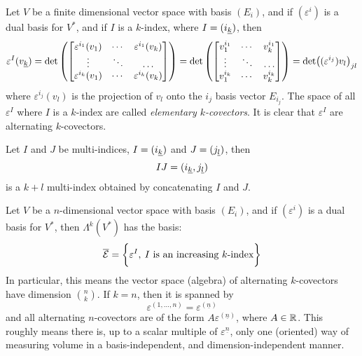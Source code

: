 \documentclass[../main-manifolds.tex]{subfiles}
\begin{document}
\begin{definition}
    Let $V$ be a finite dimensional vector space with basis $(E_i)$, and if $(\varepsilon^i)$ is a dual basis for $V^*$, and if $I$ is a $k$-index, where $I = (\Ul{i}[k])$, then
    \[
        \varepsilon^I(\Ul{v}[k]) = \det\left(\begin{bmatrix}
            \varepsilon^{i_1}(v_1) & \cdots & \varepsilon^{i_1}(v_k)\\
            \vdots & \ddots & \ldots \\
            \varepsilon^{i_k}(v_1) & \cdots & \varepsilon^{i_k}(v_k)
        \end{bmatrix}\right) = \det\left(\begin{bmatrix}
            v_1^{i_1}  & \cdots & v_k^{i_1} \\
            \vdots     & \ddots & \ldots    \\
            v_1^{i_k}  & \cdots & v_k^{i_k}
        \end{bmatrix}\right) = \det((\varepsilon^{i_j})v_l)_{jl}
    \]
    where $\varepsilon^{i_j}(v_l)$ is the projection of $v_l$ onto the $i_j$ basis vector $E_{i_j}$. The space of all $\varepsilon^I$ where $I$ is a $k$-index are called \emph{elementary $k$-covectors}. It is clear that $\varepsilon^I$ are alternating $k$-covectors.
\end{definition}

\begin{definition}
    Let $I$ and $J$ be multi-indices, $I = (\Ul{i}[k])$ and $J = (\Ul{j}[l])$, then
    \[
    IJ = (\Ul{i}[k],\Ul{j}[l])
    \]
    is a $k+l$ multi-index obtained by concatenating $I$ and $J$.
\end{definition}

\begin{wts}[Proposition 14.8]\label{lee-chp14:prop-14.8}
    Let $V$ be a $n$-dimensional vector space with basis $(E_i)$, and if $(\varepsilon^i)$ is a dual basis for $V^*$, then $\Lambda^k(V^*)$ has the basis:
    \[
        \overline{\mathcal{E}}=\biggl\{{\varepsilon^I,\: I\text{ is an increasing }k\text{-index}}\biggr\}
    \]
    In particular, this means the vector space (algebra) of alternating $k$-covectors have dimension $\binom{n}{k}$. If $k=n$, then it is spanned by 
    \[
        \varepsilon^{(1,\ldots,n)}=\varepsilon^{(\underline{n})}
    \]
    and all alternating $n$-covectors are of the form $A\varepsilon^{(\underline{n})}$, where $A\in\mathbb{R}$. This roughly means there is, up to a scalar multiple of $\varepsilon^{\underline{n}}$, only one (oriented) way of measuring volume in a basis-independent, and dimension-independent manner.
\end{wts}
\end{document}
